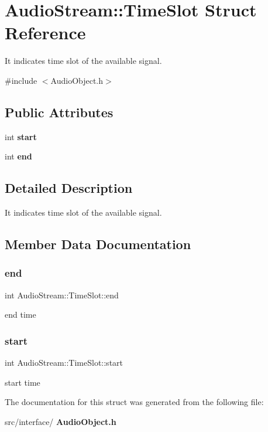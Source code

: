 \section{Audio\+Stream\+:\+:Time\+Slot Struct Reference}
\label{struct_audio_stream_1_1_time_slot}


It indicates time slot of the available signal.  




{\ttfamily \#include $<$Audio\+Object.\+h$>$}

\subsection*{Public Attributes}
\begin{DoxyCompactItemize}
\item 
int \textbf{ start}
\item 
int \textbf{ end}
\end{DoxyCompactItemize}


\subsection{Detailed Description}
It indicates time slot of the available signal. 

\subsection{Member Data Documentation}
\mbox{\label{struct_audio_stream_1_1_time_slot_a8e20d0e50a37bade2849f0c09f1034cc}} 
\subsubsection{end}
{\footnotesize\ttfamily int Audio\+Stream\+::\+Time\+Slot\+::end}

end time \mbox{\label{struct_audio_stream_1_1_time_slot_ae5191a76f4255eec3ea4fb6f7c3a5246}} 
\subsubsection{start}
{\footnotesize\ttfamily int Audio\+Stream\+::\+Time\+Slot\+::start}

start time 

The documentation for this struct was generated from the following file\+:\begin{DoxyCompactItemize}
\item 
src/interface/\textbf{ Audio\+Object.\+h}\end{DoxyCompactItemize}
